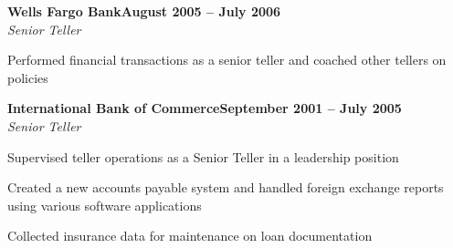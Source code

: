 \documentclass[letterpaper,10pt]{article}
\newcommand{\heading}[2]{
  \hspace{10pt}#1\hfill#2\\
}
\newcommand{\headingBf}[2]{
  \heading{\textbf{#1}}{\textbf{#2}}
}
\newcommand{\headingIt}[2]{
  \heading{\textit{#1}}{\textit{#2}}
}
\newenvironment{resume_list}{
  \vspace{-7pt}
  \begin{itemize}[itemsep=-2px, parsep=1pt, leftmargin=30pt]
}{
  \end{itemize}
}
\begin{document}
  \headingBf{Wells Fargo Bank}{August 2005 -- July 2006}
  \headingIt{Senior Teller}{}
  \begin{resume_list}
    \item Performed financial transactions as a senior teller and coached other tellers on policies
  \end{resume_list}

  \headingBf{International Bank of Commerce}{September 2001 -- July 2005}
  \headingIt{Senior Teller}{}
  \begin{resume_list}
    \item Supervised teller operations as a Senior Teller in a leadership position
    \item Created a new accounts payable system and handled foreign exchange reports using various software applications
    \item Collected insurance data for maintenance on loan documentation
  \end{resume_list}
\end{document}
